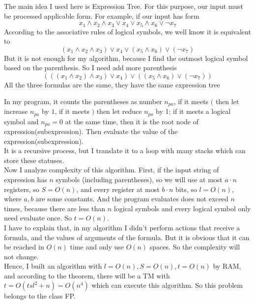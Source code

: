 \documentclass[a4papper]{article}
\theoremstyle{neosn}
\begin{document}
    The main idea I used here is Expression Tree.
    For this purpose, our input must be processed applicable form.
    For example, if our input has form
    \[
        x_1 \land x_2 \land x_3 \lor x_4 \lor x_5 \land x_6 \lor \neg x_7
    \]
    According to the associative rules of logical symbols, we well know it is
    equivalent to
    \[
        (x_1 \land x_2 \land x_3) \lor x_4 \lor (x_5 \land x_6) \lor (\neg x_7)
    \]
    But it is not enough for my algorithm, because I find the outmost logical symbol
    based on the parenthesis.
    So I need add more parenthesis
    \[
        (((x_1 \land x_2) \land x_3) \lor x_4) \lor ((x_5 \land x_6) \lor (\neg x_7))
    \]
    All the three formulas are the same, they have the same expression tree

    

    In my program, it counts the parentheses as number $n_{pa}$, if it meets $($ then let
    increase $n_{pa}$ by $1$, if it meets $)$ then let reduce $n_{pa}$ by 1;
    if it meets a logical symbol and $n_{pa} = 0$ at the same time, then it is the root node
    of expression(subexpression).
    Then evaluate the value of the expression(subexpression). \\
    It is a recursive process, but I translate it to a loop with many stacks which can store
    these statuses. \\

    Now I analyze complexity of this algorithm.
    First, if the input string of expression has $n$ symbols (including parentheses), so we will
    use at most $a\cdot n$ registers, so $S=O(n)$, and every register at most $b \cdot n$ bits, so
    $l=O(n)$, where $a,b$ are some constants.
    And the program evaluates does not exceed $n$ times, because there are less than $n$ logical symbols
    and every logical symbol only need evaluate once.
    So $t=O(n)$. \\

    I have to explain that, in my algorithm I didn't perform actions that receive a formula, and the values
    of arguments of the formula.
    But it is obvious that it can be reached in $O(n)$ time and only use $O(n)$ spaces.
    So the complexity will not change. \\

    Hence, I built an algorithm with $l=O(n), S=O(n), t=O(n)$ by RAM, and according to the theorem, there
    will be a TM with $t=O(tsl^2+n)=O(n^4)$ which can execute this algorithm.
    So this problem belongs to the class FP. \\
\end{document}
